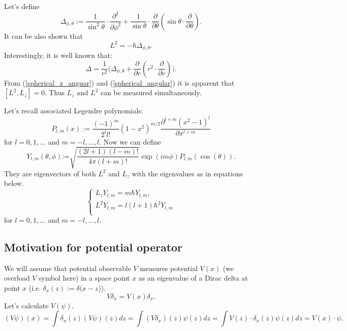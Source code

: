 \documentclass[main.tex]{subfiles}
\begin{document}
Let's define
\begin{equation}
\Delta_{\phi, \theta}:= \frac{1}{\sin ^2\theta}\cdot\frac{\partial ^2}{\partial \phi ^2}+\frac{1}{\sin \theta}\cdot\frac{\partial }{\partial \theta }\left(\sin \theta \cdot \frac{\partial}{\partial \theta }\right).
\end{equation}
It can be also shown that 
\begin{equation}
\label{spherical_angular}
\boxed{
L^2 = -\hbar \Delta_{\phi, \theta}.
}
\end{equation}
Interestingly, it is well known that:
\begin{equation}
\Delta = \frac{1}{r^2}\Bigg(\Delta _{\phi, \theta}+\frac{\partial }{\partial r}\left(r^2 \cdot\frac{\partial}{\partial r}\right)\Bigg).
\end{equation}
From (\ref{spherical_z_anguar}) and (\ref{spherical_angular}) it is apparent that $[L^2,L_z]=0$. Thus $L_z$ and $L^2$ can be measured simultaneously.

Let's recall associated Legendre polynomials:
\begin{equation}
P_{l,m}(x):=\frac{(-1)^m}{2^l l!} \left(1-x^2\right)^{m/2} \frac{\partial ^{l+m}\left(x^2-1\right)^l}{\partial x^{l+m}}
\end{equation}
for $l=0, 1, \dots$ and $m=-l,\dots, l$.
Now we can define
\begin{equation}
Y_{l,m}(\theta ,\phi )\text{:=}\sqrt{\frac{(2 l+1) (l-m)!}{4 \pi  (l+m)!}} \exp (i m \phi ) P_{l,m}(\cos (\theta )).
\end{equation}
They are eigenvectors of both $L^2$ and $L_z$ with the eigenvalues as in equations below.
\begin{equation}
\boxed{
\begin{cases}
L_z Y_{l,m} = m\hbar Y_{l,m},\\
L^2 Y_{l,m} = l(l+1)\hbar^2 Y_{l,m}\\
\end{cases}
}
\end{equation}
for $l=0, 1, \dots$ and $m=-l,\dots, l$.
\subsection{Motivation for potential operator}

We will assume that potential observable $V$ measures
potential $V(x)$ (we overload $V$ symbol here) in a space point $x$ as an eigenvalue of a Dirac delta at point $x$ (i.e. $\delta_x(z):=\delta(x - z$)).
\begin{equation}
V\delta_x = V(x)\delta_x.
\end{equation}
Let's calculate $V(\psi)$.
\begin{equation}
(V\psi)(x) = \int \delta_x(z) (V\psi)(z)dz = \int (V\delta_x)(z)\psi(z)dz = \int V(z)\cdot \delta_x(z)\psi(z)dz = V(x)\cdot \psi. 
\end{equation}
\end{document}
